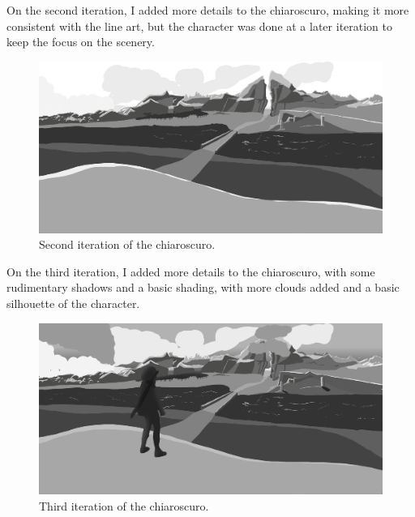 \documentclass{cup-pan}
\begin{document}
        On the second iteration, I added more details to the chiaroscuro, making it more consistent with the line art, but the character was done at a later iteration to keep the focus on the scenery.\\
        \begin{figure}[H]
            \includegraphics[width=\textwidth]{Imagenes/Fanart1/Claroscuro/Imagen2.png}
            \caption{Second iteration of the chiaroscuro.}
        \end{figure}

        On the third iteration, I added more details to the chiaroscuro, with some rudimentary shadows and a basic shading, with more clouds added and a basic silhouette of the character.\\
        \begin{figure}[H]
            \includegraphics[width=\textwidth]{Imagenes/Fanart1/Claroscuro/Imagen3.png}
            \caption{Third iteration of the chiaroscuro.}
        \end{figure}
\end{document}
